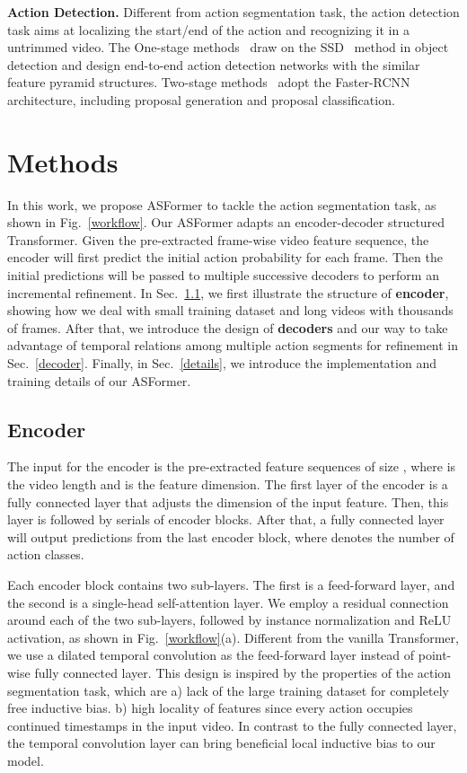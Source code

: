 \documentclass{bmvc2k}
\begin{document}
\noindent
\textbf{Action Detection.} Different from action segmentation task, the action detection task aims at localizing the start/end of the action and recognizing it in a untrimmed video. The One-stage methods~\cite{one_stage_action_det1,one_stage_action_det2} draw on the SSD~\cite{ssd} method in object detection and design end-to-end action detection networks with the similar feature pyramid structures. Two-stage methods~\cite{two_stage_action_det1,two_stage_action_det2} adopt the Faster-RCNN~\cite{faster_rcnn} architecture, including proposal generation and proposal classification. 



\section{Methods}
In this work, we propose ASFormer to tackle the action segmentation task, as shown in Fig.~\ref{workflow}. Our ASFormer adapts an encoder-decoder structured Transformer. Given the pre-extracted frame-wise video feature sequence, the encoder will first predict the initial action probability for each frame. Then the initial predictions will be passed to multiple successive decoders to perform an incremental refinement. In Sec.~\ref{encoder}, we first illustrate the structure of \textbf{encoder}, showing how we deal with small training dataset and long videos with thousands of frames. After that, we introduce the design of \textbf{decoders} and our way to take advantage of temporal relations among multiple action segments for refinement in Sec.~\ref{decoder}. Finally, in Sec.~\ref{details}, we introduce the implementation and training details of our ASFormer.


\subsection{Encoder}
\label{encoder}
The input for the encoder is the pre-extracted feature sequences of size , where  is the video length and  is the feature dimension. The first layer of the encoder is a fully connected layer that adjusts the dimension of the input feature. Then, this layer is followed by serials of encoder blocks. After that, a fully connected layer will output predictions  from the last encoder block, where  denotes the number of action classes.  

Each encoder block contains two sub-layers. The first is a feed-forward layer, and the second is a single-head self-attention layer. We employ a residual connection around each of the two sub-layers, followed by instance normalization and ReLU activation, as shown in Fig.~\ref{workflow}(a). Different from the vanilla Transformer, we use a dilated temporal convolution as the feed-forward layer instead of point-wise fully connected layer. This design is inspired by the properties of the action segmentation task, which are a) lack of the large training dataset for completely free inductive bias. b) high locality of features since every action occupies continued timestamps in the input video. In contrast to the fully connected layer, the temporal convolution layer can bring beneficial local inductive bias to our model.
\end{document}
